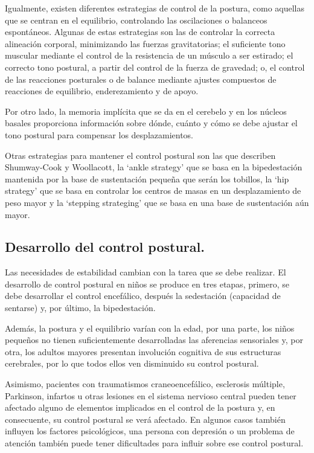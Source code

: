 Igualmente, existen diferentes estrategias de control de la postura, como aquellas que se centran en el equilibrio, controlando las oscilaciones o balanceos espontáneos. Algunas de estas estrategias son las de controlar la correcta alineación corporal, minimizando las fuerzas gravitatorias; el suficiente tono muscular mediante el control de la resistencia de un músculo a ser estirado; el correcto tono postural, a partir del control de la fuerza de gravedad; o, el control de las reacciones posturales o de balance mediante ajustes compuestos de reacciones de equilibrio, enderezamiento y de apoyo. 

Por otro lado, la memoria implícita que se da en el cerebelo y en los núcleos basales proporciona información sobre dónde, cuánto y cómo se debe ajustar el tono postural para compensar los desplazamientos.

Otras estrategias para mantener el control postural son las que describen Shumway-Cook y Woollacott, la ‘ankle strategy’ que se basa en la bipedestación mantenida por la base de sustentación pequeña que serán los tobillos, la ‘hip strategy’ que se basa en controlar los centros de masas en un desplazamiento de peso mayor y la ‘stepping strateging’ que se basa en una base de sustentación aún mayor.

\subsection{Desarrollo del control postural.} 
Las necesidades de estabilidad cambian con la tarea que se debe realizar. El desarrollo de control postural en niños se produce en tres etapas, primero, se debe desarrollar el control encefálico, después la sedestación (capacidad de sentarse) y, por último, la bipedestación.

Además, la postura y el equilibrio varían con la edad, por una parte, los niños pequeños\cite{Libro3_pediatria} no tienen suficientemente desarrolladas las aferencias sensoriales y, por otra, los adultos mayores\cite{Libro4_mayores} presentan involución cognitiva de sus estructuras cerebrales, por lo que todos ellos ven disminuido su control postural.

Asimismo, pacientes con traumatismos craneoencefálico, esclerosis múltiple, Parkinson, infartos u otras lesiones en el sistema nervioso central pueden tener afectado alguno de elementos implicados en el control de la postura y, en consecuente, su control postural se verá afectado. En algunos casos también influyen los factores psicológicos, una persona con depresión o un problema de atención también puede tener dificultades para influir sobre ese control postural.


